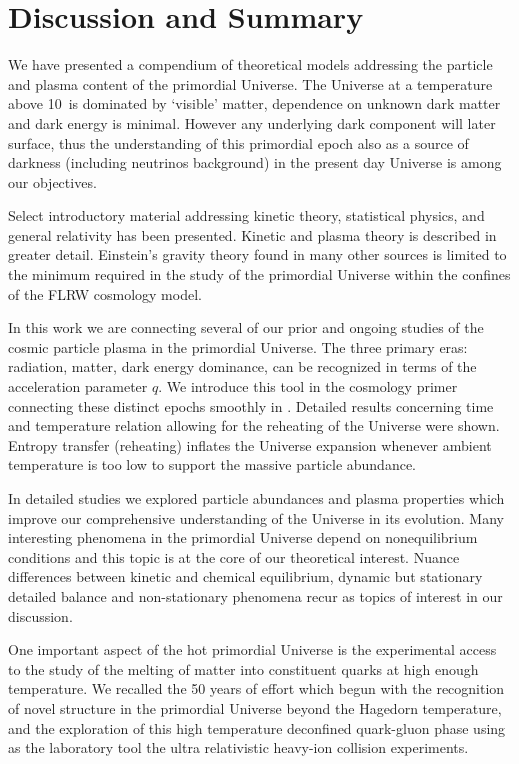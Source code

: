 \section{Discussion and Summary}\label{part6}
We have presented a compendium of theoretical models addressing the particle and plasma content of the primordial Universe. The Universe at a temperature above 10\keV\ is dominated by `visible' matter, dependence on unknown dark matter and dark energy is minimal. However any underlying dark component will later surface, thus the understanding of this primordial epoch also as a source of darkness (including neutrinos background) in the present day Universe is among our objectives.

Select introductory material addressing kinetic theory, statistical physics, and general relativity has been presented. Kinetic and plasma theory is described in greater detail. Einstein's gravity theory found in many other sources is limited to the minimum required in the study of the primordial Universe within the confines of the FLRW cosmology model. 

In this work we are connecting several of our prior and ongoing studies of the cosmic particle plasma in the primordial Universe. The three primary eras: radiation, matter, dark energy dominance, can be recognized in terms of the acceleration parameter $q$. We introduce this tool in the cosmology primer  connecting these distinct epochs smoothly in . Detailed results concerning time and temperature relation allowing for the reheating of the Universe were shown. Entropy transfer (reheating) inflates the Universe expansion whenever ambient temperature is too low to support the massive particle abundance.

In detailed studies we explored particle abundances and plasma properties which improve our comprehensive understanding of the Universe in its evolution. Many interesting phenomena in the primordial Universe depend on nonequilibrium conditions and this topic is at the core of our theoretical interest. Nuance differences between kinetic and chemical equilibrium, dynamic but stationary detailed balance and non-stationary phenomena recur as topics of interest in our discussion. 

One important aspect of the hot primordial Universe is the experimental access to the study of the melting of matter into constituent quarks at high enough temperature. We recalled the 50 years of effort which begun with the recognition of novel structure in the primordial Universe beyond the Hagedorn temperature, and the exploration of this high temperature deconfined quark-gluon phase using as the laboratory tool the ultra relativistic heavy-ion collision experiments. 

